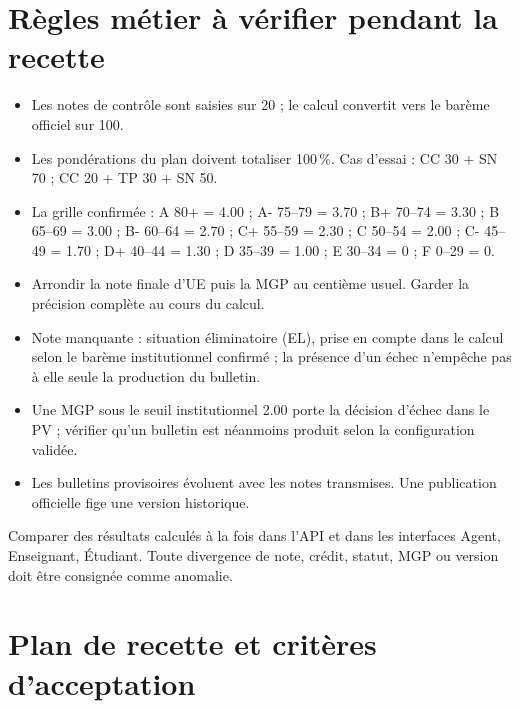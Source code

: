 \documentclass[10pt,a4paper]{article}
\begin{document}
\section{Règles métier à vérifier pendant la recette}

\begin{itemize}
\item Les notes de contrôle sont saisies sur 20 ; le calcul convertit vers le barème officiel sur 100.
\item Les pondérations du plan doivent totaliser 100\,\%. Cas d’essai : CC 30 + SN 70 ; CC 20 + TP 30 + SN 50.
\item La grille confirmée : A 80+ = 4.00 ; A- 75--79 = 3.70 ; B+ 70--74 = 3.30 ; B 65--69 = 3.00 ; B- 60--64 = 2.70 ; C+ 55--59 = 2.30 ; C 50--54 = 2.00 ; C- 45--49 = 1.70 ; D+ 40--44 = 1.30 ; D 35--39 = 1.00 ; E 30--34 = 0 ; F 0--29 = 0.
\item Arrondir la note finale d’UE puis la MGP au centième usuel. Garder la précision complète au cours du calcul.
\item Note manquante : situation éliminatoire (EL), prise en compte dans le calcul selon le barème institutionnel confirmé ; la présence d’un échec n’empêche pas à elle seule la production du bulletin.
\item Une MGP sous le seuil institutionnel 2.00 porte la décision d’échec dans le PV ; vérifier qu’un bulletin est néanmoins produit selon la configuration validée.
\item Les bulletins provisoires évoluent avec les notes transmises. Une publication officielle fige une version historique.
\end{itemize}

Comparer des résultats calculés à la fois dans l’API et dans les interfaces Agent, Enseignant, Étudiant. Toute divergence de note, crédit, statut, MGP ou version doit être consignée comme anomalie.

\section{Plan de recette et critères d’acceptation}
\end{document}
